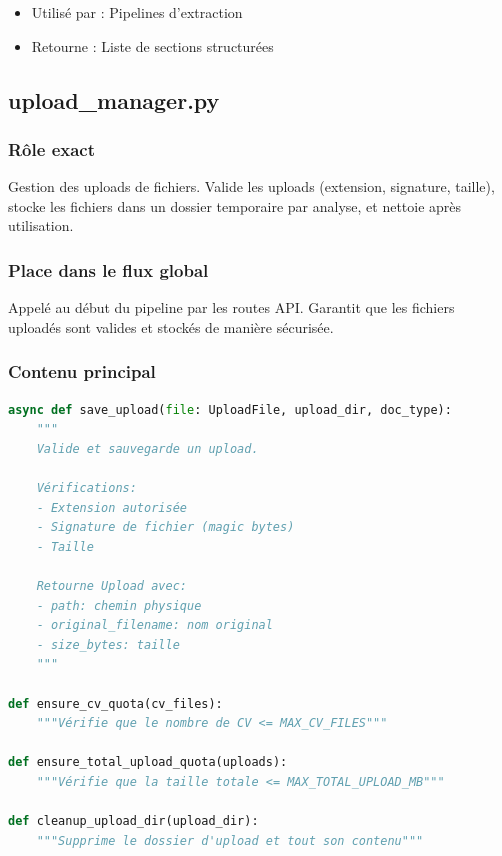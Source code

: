 \documentclass[12pt,a4paper,oneside]{book}
\begin{document}
\begin{itemize}
    \item Utilisé par : Pipelines d'extraction
    \item Retourne : Liste de sections structurées
\end{itemize}

\subsection{upload\_manager.py}

\subsubsection{Rôle exact}

Gestion des uploads de fichiers. Valide les uploads (extension, signature, taille), stocke les fichiers dans un dossier temporaire par analyse, et nettoie après utilisation.

\subsubsection{Place dans le flux global}

Appelé au début du pipeline par les routes API. Garantit que les fichiers uploadés sont valides et stockés de manière sécurisée.

\subsubsection{Contenu principal}

\begin{lstlisting}[language=Python]
async def save_upload(file: UploadFile, upload_dir, doc_type):
    """
    Valide et sauvegarde un upload.
    
    Vérifications:
    - Extension autorisée
    - Signature de fichier (magic bytes)
    - Taille
    
    Retourne Upload avec:
    - path: chemin physique
    - original_filename: nom original
    - size_bytes: taille
    """

def ensure_cv_quota(cv_files):
    """Vérifie que le nombre de CV <= MAX_CV_FILES"""

def ensure_total_upload_quota(uploads):
    """Vérifie que la taille totale <= MAX_TOTAL_UPLOAD_MB"""

def cleanup_upload_dir(upload_dir):
    """Supprime le dossier d'upload et tout son contenu"""
\end{lstlisting}
\end{document}
